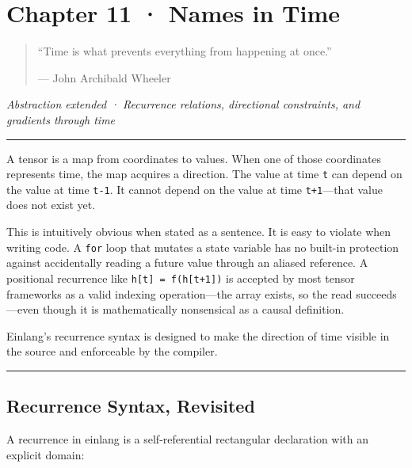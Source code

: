 \documentclass[11pt,]{article}
\begin{document}
\newpage

\hypertarget{chapter-11-names-in-time}{%
\section{Chapter 11 · Names in Time}\label{chapter-11-names-in-time}}

\begin{quote}
``Time is what prevents everything from happening at once.''

--- John Archibald Wheeler
\end{quote}

\emph{Abstraction extended · Recurrence relations, directional
constraints, and gradients through time}

\begin{center}\rule{0.5\linewidth}{0.4pt}\end{center}

A tensor is a map from coordinates to values. When one of those
coordinates represents time, the map acquires a direction. The value at
time \texttt{t} can depend on the value at time \texttt{t-1}. It cannot
depend on the value at time \texttt{t+1}---that value does not exist
yet.

This is intuitively obvious when stated as a sentence. It is easy to
violate when writing code. A \texttt{for} loop that mutates a state
variable has no built-in protection against accidentally reading a
future value through an aliased reference. A positional recurrence like
\texttt{h{[}t{]}\ =\ f(h{[}t+1{]})} is accepted by most tensor
frameworks as a valid indexing operation---the array exists, so the read
succeeds---even though it is mathematically nonsensical as a causal
definition.

Einlang's recurrence syntax is designed to make the direction of time
visible in the source and enforceable by the compiler.

\begin{center}\rule{0.5\linewidth}{0.4pt}\end{center}

\hypertarget{recurrence-syntax-revisited}{%
\subsection{Recurrence Syntax,
Revisited}\label{recurrence-syntax-revisited}}

A recurrence in einlang is a self-referential rectangular declaration
with an explicit domain:
\end{document}
